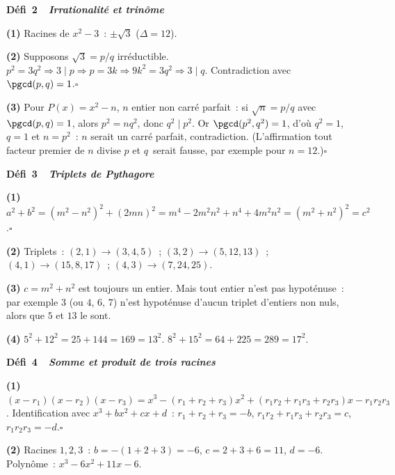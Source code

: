 \noindent{}
{\color{BO}\bfseries\small D\'efi~2~\textendash\ \textit{Irrationalit\'e et trin\^ome}}
\par\smallskip

\textbf{(1)} Racines de $x^2-3$~: $\pm\sqrt{3}$ ($\Delta=12$).

\textbf{(2)} Supposons $\sqrt{3}=p/q$ irr\'eductible.
$p^2=3q^2\Rightarrow3\mid p\Rightarrow p=3k\Rightarrow9k^2=3q^2\Rightarrow3\mid q$.
Contradiction avec $\pgcd(p,q)=1$.\hfill$\square$

\textbf{(3)} Pour $P(x)=x^2-n$, $n$ entier non carr\'e parfait~:
si $\sqrt{n}=p/q$ avec $\pgcd(p,q)=1$, alors $p^2=nq^2$, donc $q^2\mid p^2$.
Or $\pgcd(p^2,q^2)=1$, d'o\`u $q^2=1$, $q=1$ et $n=p^2$~: $n$ serait un carr\'e parfait, contradiction.
(L'affirmation \og tout facteur premier de $n$ divise $p$ et $q$\fg\ serait fausse, par exemple pour $n=12$.)\hfill$\square$

\noindent{}
{\color{BO}\bfseries\small D\'efi~3~\textendash\ \textit{Triplets de Pythagore}}
\par\smallskip

\textbf{(1)} $a^2+b^2=(m^2-n^2)^2+(2mn)^2=m^4-2m^2n^2+n^4+4m^2n^2=(m^2+n^2)^2=c^2$.\hfill$\square$

\textbf{(2)} Triplets~:
$(2,1)\to(3,4,5)$~; $(3,2)\to(5,12,13)$~;
$(4,1)\to(15,8,17)$~; $(4,3)\to(7,24,25)$.

\textbf{(3)} $c=m^2+n^2$ est toujours un entier. Mais tout entier n'est pas hypot\'enuse~:
par exemple $3$ (ou $4$, $6$, $7$) n'est hypot\'enuse d'aucun triplet d'entiers non nuls, alors que $5$ et $13$ le sont.

\textbf{(4)} $5^2+12^2=25+144=169=13^2$.\checkmark\quad
$8^2+15^2=64+225=289=17^2$.\checkmark

\noindent{}
{\color{BO}\bfseries\small D\'efi~4~\textendash\ \textit{Somme et produit de trois racines}}
\par\smallskip

\textbf{(1)} $(x-r_1)(x-r_2)(x-r_3)=x^3-(r_1+r_2+r_3)x^2
+(r_1r_2+r_1r_3+r_2r_3)x-r_1r_2r_3$.
Identification avec $x^3+bx^2+cx+d$~:
$r_1+r_2+r_3=-b$, $r_1r_2+r_1r_3+r_2r_3=c$, $r_1r_2r_3=-d$.\hfill$\square$

\textbf{(2)} Racines $1,2,3$~: $b=-(1+2+3)=-6$, $c=2+3+6=11$, $d=-6$.
Polyn\^ome~: $x^3-6x^2+11x-6$.

